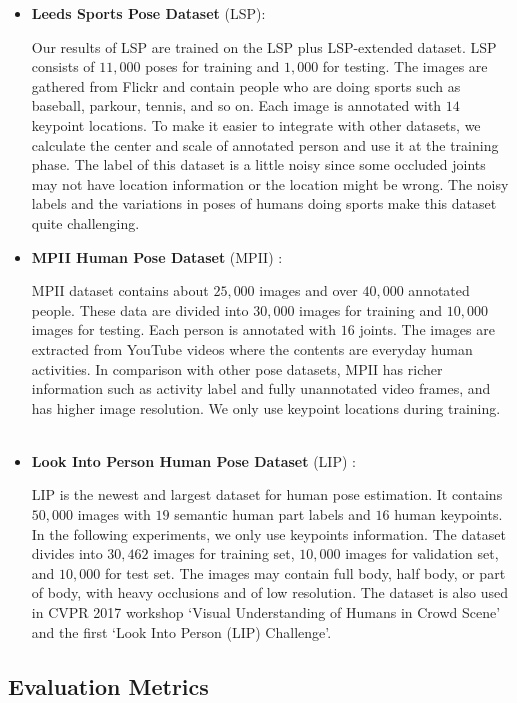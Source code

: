 \documentclass[10pt,twocolumn,letterpaper]{article}
\begin{document}
\begin{itemize}

\item \textbf{Leeds Sports Pose Dataset} (LSP):

Our results of LSP are trained on the LSP plus LSP-extended dataset. LSP consists of $11{,}000$ poses for training and $1{,}000$ for testing. The images are gathered from Flickr and contain people who are doing sports such as baseball, parkour, tennis, and so on. Each image is annotated with $14$ keypoint locations. To make it easier to integrate with other datasets, we calculate the center and scale of annotated person and use it at the training phase. The label of this dataset is a little noisy since some occluded joints may not have location information or the location might be wrong. The noisy labels and the variations in poses of humans doing sports make this dataset quite challenging.

\item \textbf{MPII Human Pose Dataset} (MPII) :

MPII dataset contains about $25{,}000$ images and over $40{,}000$ annotated people. These data are divided into $30{,}000$ images for training and $10{,}000$ images for testing. Each person is annotated with $16$ joints. The images are extracted from YouTube videos where the contents are everyday human activities. In comparison with other pose datasets, MPII has richer information such as activity label and fully unannotated video frames, and has higher image resolution. We only use keypoint locations during training.
　
\item \textbf{Look Into Person Human Pose Dataset} (LIP) :

LIP is the newest and largest dataset for human pose estimation. It contains $50{,}000$ images with $19$ semantic human part labels and $16$ human keypoints. In the following experiments, we only use keypoints information. The dataset divides into $30{,}462$ images for training set, $10{,}000$ images for validation set, and $10{,}000$ for test set. The images may contain full body, half body, or part of body, with heavy occlusions and of low resolution. The dataset is also used in CVPR 2017 workshop `Visual Understanding of Humans in Crowd Scene' and the first `Look Into Person (LIP) Challenge'.

\end{itemize}

\subsection{Evaluation Metrics}
\end{document}
